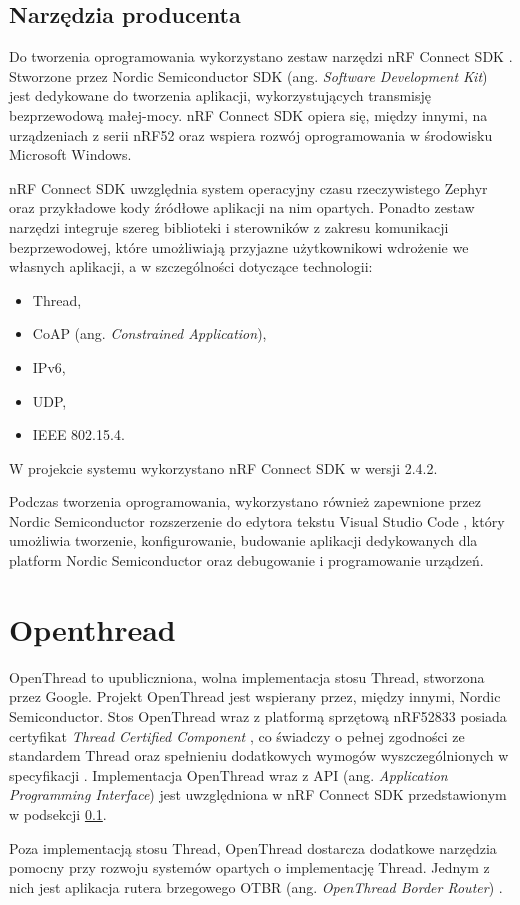 \subsection{Narzędzia producenta}
\label{subsec:producer-tools}

    Do tworzenia oprogramowania wykorzystano zestaw narzędzi nRF Connect SDK \cite{nrf-connect}. Stworzone przez Nordic Semiconductor SDK (ang. \textit{Software Development Kit}) jest dedykowane do tworzenia aplikacji, wykorzystujących transmisję bezprzewodową małej-mocy. nRF Connect SDK opiera się, między innymi, na urządzeniach z serii nRF52 oraz wspiera rozwój oprogramowania w środowisku Microsoft Windows.

    nRF Connect SDK uwzględnia system operacyjny czasu rzeczywistego Zephyr oraz przykładowe kody źródłowe aplikacji na nim opartych. Ponadto zestaw narzędzi integruje szereg biblioteki i sterowników z zakresu komunikacji bezprzewodowej, które umożliwiają przyjazne użytkownikowi wdrożenie we własnych aplikacji, a w szczególności dotyczące technologii:
    \begin{itemize}
        \item Thread,
        \item CoAP (ang. \textit{Constrained Application}),
        \item IPv6,
        \item UDP,
        \item IEEE 802.15.4.
    \end{itemize}

    W projekcie systemu wykorzystano nRF Connect SDK w wersji 2.4.2.

    Podczas tworzenia oprogramowania, wykorzystano również zapewnione przez Nordic Semiconductor rozszerzenie do edytora tekstu Visual Studio Code \cite{nrf-ide}, który umożliwia tworzenie, konfigurowanie, budowanie aplikacji dedykowanych dla platform Nordic Semiconductor oraz debugowanie i programowanie urządzeń. 

\section{Openthread}

    OpenThread to upubliczniona, wolna implementacja stosu Thread, stworzona przez Google. Projekt OpenThread jest wspierany przez, między innymi, Nordic Semiconductor. Stos OpenThread wraz z platformą sprzętową nRF52833 posiada certyfikat \textit{Thread Certified Component} \cite{nrf52833-tcc}, co świadczy o pełnej zgodności ze standardem Thread oraz spełnieniu dodatkowych wymogów wyszczególnionych w specyfikacji \cite{thread-1.3.0}. Implementacja OpenThread wraz z API (ang. \textit{Application Programming Interface}) jest uwzględniona w nRF Connect SDK przedstawionym w podsekcji \ref{subsec:producer-tools}.

    Poza implementacją stosu Thread, OpenThread dostarcza dodatkowe narzędzia pomocny przy rozwoju systemów opartych o implementację Thread. Jednym z nich jest aplikacja rutera brzegowego OTBR (ang. \textit{OpenThread Border Router}) \cite{openthread-br}.
